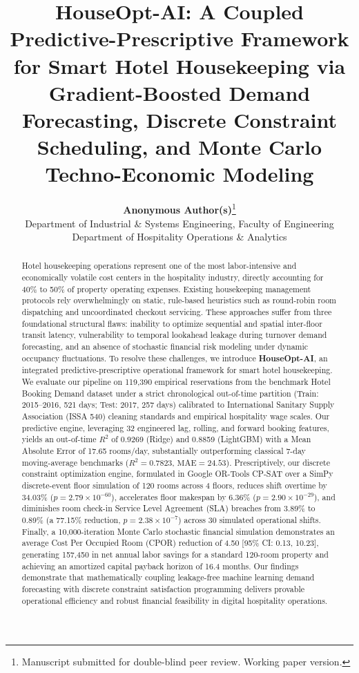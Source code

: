 \documentclass[11pt,a4paper]{article}
\title{\textbf{HouseOpt-AI: A Coupled Predictive-Prescriptive Framework for Smart Hotel Housekeeping via Gradient-Boosted Demand Forecasting, Discrete Constraint Scheduling, and Monte Carlo Techno-Economic Modeling}}
\author{
    \textbf{Anonymous Author(s)}\footnote{Manuscript submitted for double-blind peer review. Working paper version.}\\
    Department of Industrial \& Systems Engineering, Faculty of Engineering\\
    Department of Hospitality Operations \& Analytics
}
\date{}
\newcommand{\INR}{\text{INR }}
\begin{document}
\maketitle

\begin{abstract}
Hotel housekeeping operations represent one of the most labor-intensive and economically volatile cost centers in the hospitality industry, directly accounting for 40\% to 50\% of property operating expenses. Existing housekeeping management protocols rely overwhelmingly on static, rule-based heuristics such as round-robin room dispatching and uncoordinated checkout servicing. These approaches suffer from three foundational structural flaws: inability to optimize sequential and spatial inter-floor transit latency, vulnerability to temporal lookahead leakage during turnover demand forecasting, and an absence of stochastic financial risk modeling under dynamic occupancy fluctuations. To resolve these challenges, we introduce \textbf{HouseOpt-AI}, an integrated predictive-prescriptive operational framework for smart hotel housekeeping. We evaluate our pipeline on 119,390 empirical reservations from the benchmark Hotel Booking Demand dataset under a strict chronological out-of-time partition (Train: 2015--2016, 521 days; Test: 2017, 257 days) calibrated to International Sanitary Supply Association (ISSA 540) cleaning standards and empirical hospitality wage scales. Our predictive engine, leveraging 32 engineered lag, rolling, and forward booking features, yields an out-of-time $R^2$ of 0.9269 (Ridge) and 0.8859 (LightGBM) with a Mean Absolute Error of 17.65 rooms/day, substantially outperforming classical 7-day moving-average benchmarks ($R^2 = 0.7823$, $\text{MAE} = 24.53$). Prescriptively, our discrete constraint optimization engine, formulated in Google OR-Tools CP-SAT over a SimPy discrete-event floor simulation of 120 rooms across 4 floors, reduces shift overtime by 34.03\% ($p = 2.79 \times 10^{-60}$), accelerates floor makespan by 6.36\% ($p = 2.90 \times 10^{-29}$), and diminishes room check-in Service Level Agreement (SLA) breaches from 3.89\% to 0.89\% (a 77.15\% reduction, $p = 2.38 \times 10^{-7}$) across 30 simulated operational shifts. Finally, a 10,000-iteration Monte Carlo stochastic financial simulation demonstrates an average Cost Per Occupied Room (CPOR) reduction of \INR 4.50 [95\% CI: 0.13, 10.23], generating \INR 157,450 in net annual labor savings for a standard 120-room property and achieving an amortized capital payback horizon of 16.4 months. Our findings demonstrate that mathematically coupling leakage-free machine learning demand forecasting with discrete constraint satisfaction programming delivers provable operational efficiency and robust financial feasibility in digital hospitality operations.
\end{abstract}
\end{document}
